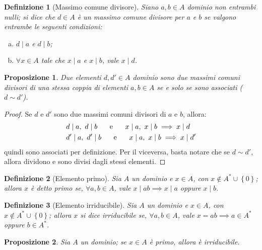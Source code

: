 \documentclass[11pt]{article}
\theoremstyle{style}
\newtheorem{definizione}{Definizione}[section]
\newtheorem{prop}{Proposizione}[section]
\numberwithin{equation}{subsection}
\begin{document}
\begin{definizione}
	[Massimo comune divisore]
	Siano $a,b \in A$ dominio non entrambi nulli; si dice che $d \in A$ \`e un \textit{massimo comune divisore} per $a$ e $b$ se valgono entrambe le seguenti condizioni:
	\begin{enumerate}[(a).]
		\item $d  \mid a$ e $d \mid b$;
		\item $\forall x \in A$ tale che $x \mid a$ e $x \mid b$, vale $x \mid d$.
	\end{enumerate}
\end{definizione}
\begin{prop}
	Due elementi $d,d' \in A$ dominio sono due massimi comuni divisori di una stessa coppia di elementi $a,b\in A$ se e solo se sono associati ($d \sim d'$).
\end{prop}
	\begin{proof}
		Se $d$ e $d'$ sono due massimi comuni divisori di $a$ e $b$, allora:
		\[
		\begin{split}
			&d \mid a, \ d  \mid b \hspace{.5cm} \text{ e } \hspace{.5cm} x \mid a, \ x  \mid b \implies x \mid d\\
			&d' \mid a, \ d'  \mid b \hspace{.5cm} \text{ e } \hspace{.5cm} x \mid a, \ x  \mid b \implies x \mid d'
		\end{split}
		\] 
		quindi sono associati per definizione.
		Per il viceversa, basta notare che se $d \sim d'$, allora dividono e sono divisi dagli stessi elementi.
	\end{proof}
\begin{definizione}
	[Elemento primo]	
	Sia $A$ un dominio e $x \in A$, con $x \not \in A^* \cup \left\{ 0 \right\} $; allora $x$ \`e detto \textit{primo} se, $\forall a,b\in A$, vale $x  \mid ab \implies x  \mid a$ oppure $x \mid b$.
\end{definizione}
\begin{definizione}
	[Elemento irriducibile]
	Sia $A$ un dominio e $x \in A$, con $x \not \in A^* \cup \left\{ 0 \right\} $; allora $x$ si dice \textit{irriducibile} se, $\forall a,b \in A$, vale $x = ab\implies a \in A^*$ oppure $b \in A^*$.
\end{definizione}
\begin{prop}\label{pimpp}
	Sia $A$ un dominio; se $x \in A$ \`e primo, allora \`e irriducibile.
\end{prop}
\end{document}
